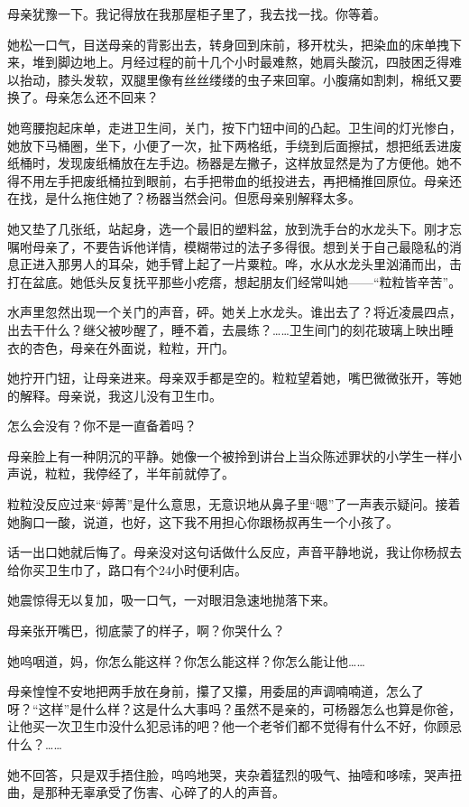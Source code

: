\documentclass[lang=cn,newtx,12pt,scheme=chinese]{elegantbook}
\begin{document}
母亲犹豫一下。我记得放在我那屋柜子里了，我去找一找。你等着。

她松一口气，目送母亲的背影出去，转身回到床前，移开枕头，把染血的床单拽下来，堆到脚边地上。月经过程的前十几个小时最难熬，她肩头酸沉，四肢困乏得难以抬动，膝头发软，双腿里像有丝丝缕缕的虫子来回窜。小腹痛如割刺，棉纸又要换了。母亲怎么还不回来？

她弯腰抱起床单，走进卫生间，关门，按下门钮中间的凸起。卫生间的灯光惨白，她放下马桶圈，坐下，小便了一次，扯下两格纸，手绕到后面擦拭，想把纸丢进废纸桶时，发现废纸桶放在左手边。杨器是左撇子，这样放显然是为了方便他。她不得不用左手把废纸桶拉到眼前，右手把带血的纸投进去，再把桶推回原位。母亲还在找，是什么拖住她了？杨器当然会问。但愿母亲别解释太多。

她又垫了几张纸，站起身，选一个最旧的塑料盆，放到洗手台的水龙头下。刚才忘嘱咐母亲了，不要告诉他详情，模糊带过的法子多得很。想到关于自己最隐私的消息正进入那男人的耳朵，她手臂上起了一片粟粒。哗，水从水龙头里汹涌而出，击打在盆底。她低头反复抚平那些小疙瘩，想起朋友们经常叫她——“粒粒皆辛苦”。

水声里忽然出现一个关门的声音，砰。她关上水龙头。谁出去了？将近凌晨四点，出去干什么？继父被吵醒了，睡不着，去晨练？……卫生间门的刻花玻璃上映出睡衣的杏色，母亲在外面说，粒粒，开门。

她拧开门钮，让母亲进来。母亲双手都是空的。粒粒望着她，嘴巴微微张开，等她的解释。母亲说，我这儿没有卫生巾。

怎么会没有？你不是一直备着吗？

母亲脸上有一种阴沉的平静。她像一个被拎到讲台上当众陈述罪状的小学生一样小声说，粒粒，我停经了，半年前就停了。

粒粒没反应过来“婷菁”是什么意思，无意识地从鼻子里“嗯”了一声表示疑问。接着她胸口一酸，说道，也好，这下我不用担心你跟杨叔再生一个小孩了。

话一出口她就后悔了。母亲没对这句话做什么反应，声音平静地说，我让你杨叔去给你买卫生巾了，路口有个24小时便利店。

她震惊得无以复加，吸一口气，一对眼泪急速地抛落下来。

母亲张开嘴巴，彻底蒙了的样子，啊？你哭什么？

她呜咽道，妈，你怎么能这样？你怎么能这样？你怎么能让他……

母亲惶惶不安地把两手放在身前，攥了又攥，用委屈的声调喃喃道，怎么了呀？“这样”是什么样？这是什么大事吗？虽然不是亲的，可杨器怎么也算是你爸，让他买一次卫生巾没什么犯忌讳的吧？他一个老爷们都不觉得有什么不好，你顾忌什么？……

她不回答，只是双手捂住脸，呜呜地哭，夹杂着猛烈的吸气、抽噎和哆嗦，哭声扭曲，是那种无辜承受了伤害、心碎了的人的声音。
\end{document}
